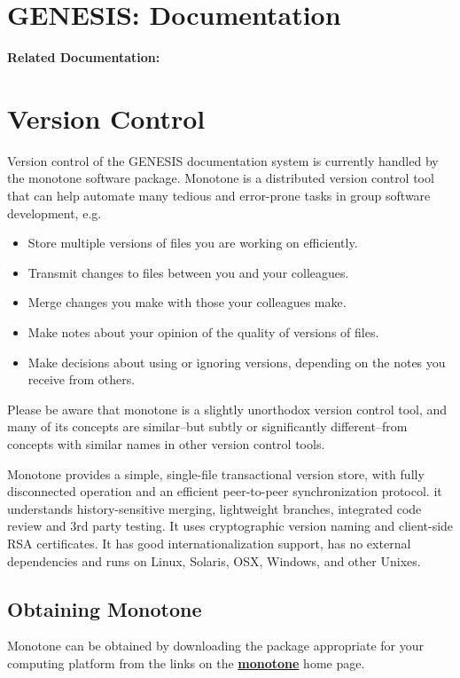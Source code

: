 \documentclass[12pt]{article}
\begin{document}
\section*{GENESIS: Documentation}

{\bf Related Documentation:}

\section*{Version Control}

Version control of the GENESIS documentation system is currently handled by the monotone software package. Monotone is a distributed version control tool that can help automate many tedious and error-prone tasks in group software development, e.g.
\begin{itemize}
\item Store multiple versions of files you are working on efficiently.
\item Transmit changes to files between you and your colleagues.
\item Merge changes you make with those your colleagues make.
\item Make notes about your opinion of the quality of versions of files.
\item Make decisions about using or ignoring versions, depending on the notes you receive from others. 
\end{itemize}
Please be aware that monotone is a slightly unorthodox version control tool, and many of its concepts are similar--but subtly or significantly different--from concepts with similar names in other version control tools. 

Monotone provides a simple, single-file transactional version store, with fully disconnected operation and an efficient peer-to-peer synchronization protocol. it understands history-sensitive merging, lightweight branches, integrated code review and 3rd party testing. It uses cryptographic version naming and client-side RSA certificates. It has good internationalization support, has no external dependencies and runs on Linux, Solaris, OSX, Windows, and other Unixes.

\subsection*{Obtaining Monotone}
Monotone can be obtained by downloading the package appropriate for your computing platform from the links on the \href{http://monotone.ca/}{\bf monotone} home page.
\end{document}
